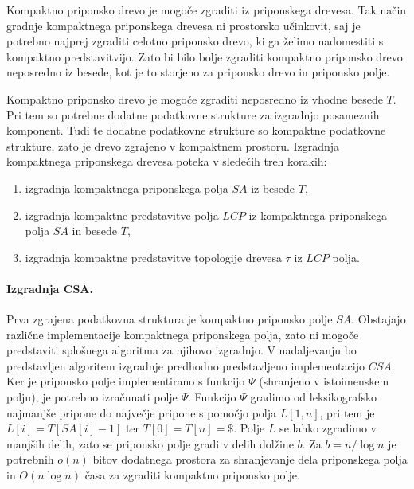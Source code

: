 Kompaktno priponsko drevo je mogoče zgraditi iz priponskega drevesa. Tak način gradnje kompaktnega priponskega drevesa ni prostorsko učinkovit, saj je potrebno najprej zgraditi celotno priponsko drevo, ki ga želimo nadomestiti s kompaktno predstavitvijo. Zato bi bilo bolje zgraditi kompaktno priponsko drevo neposredno iz besede, kot je to storjeno za priponsko drevo in priponsko polje.

Kompaktno priponsko drevo je mogoče zgraditi neposredno iz vhodne besede $T$. Pri tem so potrebne dodatne podatkovne strukture za izgradnjo posameznih komponent. Tudi te dodatne podatkovne strukture so kompaktne podatkovne strukture, zato je drevo zgrajeno v kompaktnem prostoru. Izgradnja kompaktnega priponskega drevesa poteka v sledečih treh korakih:
\begin{enumerate}
    \item izgradnja kompaktnega priponskega polja $SA$ iz besede $T$,
    \item izgradnja kompaktne predstavitve polja $LCP$ iz kompaktnega priponskega polja $SA$ in besede $T$,
    \item izgradnja kompaktne predstavitve topologije drevesa $\tau$ iz $LCP$ polja.
\end{enumerate}

\paragraph{Izgradnja CSA.}

Prva zgrajena podatkovna struktura je kompaktno priponsko polje $SA$. Obstajajo različne implementacije kompaktnega priponskega polja, zato ni mogoče predstaviti splošnega algoritma za njihovo izgradnjo. V nadaljevanju bo predstavljen algoritem izgradnje predhodno predstavljeno implementacijo $CSA$. Ker je priponsko polje implementirano s funkcijo $\Psi$ (shranjeno v istoimenskem polju), je potrebno izračunati polje $\Psi$. 
Funkcijo $\Psi$ gradimo od leksikografsko najmanjše pripone do največje pripone s pomočjo polja $L[1,n]$, pri tem je $L[i]=T[SA[i]-1]$ ter $T[0]=T[n]=\$$.
Polje $L$ se lahko zgradimo v manjših delih, zato se priponsko polje gradi v delih dolžine $b$. Za $b=n/\log{n}$ je potrebnih $o(n)$ bitov dodatnega prostora za shranjevanje dela priponskega polja in $O(n\log{n})$ časa za zgraditi kompaktno priponsko polje\cite{Navarro2016}.

